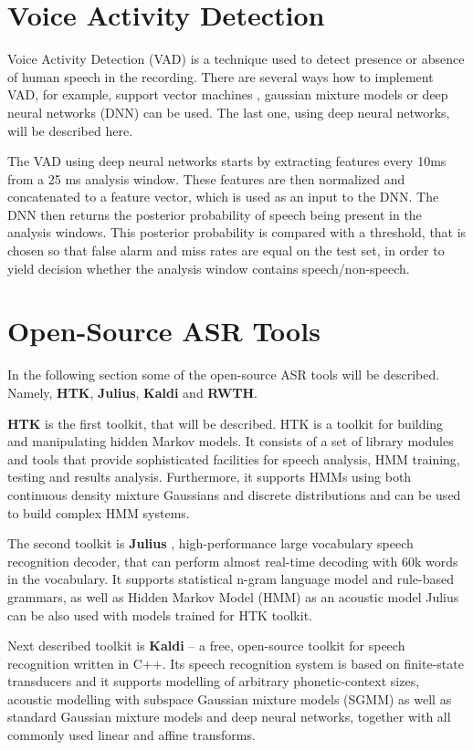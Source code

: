 \section{Voice Activity Detection}
Voice Activity Detection (VAD) is a technique used to detect presence or absence of human speech in the recording.
There are several ways how to implement VAD,
  for example, support vector machines \cite{mesgarani2006discrimination}, gaussian mixture models \cite{ng2012developing} or deep neural networks (DNN) \cite{ryant2013speech} can be used.
The last one, using deep neural networks, will be described here.

The VAD using deep neural networks starts by extracting features every 10ms from a 25 ms analysis window.
These features are then normalized and concatenated to a feature vector,
  which is used as an input to the DNN.
The DNN then returns the posterior probability of speech being present in the analysis windows.
This posterior probability is compared with a threshold,
  that is chosen so that false alarm and miss rates are equal on the test set,
  in order to yield decision whether the analysis window contains speech/non-speech.

\section{Open-Source ASR Tools}
In the following section some of the open-source ASR tools will be described.
Namely, \textbf{HTK}, \textbf{Julius}, \textbf{Kaldi} and \textbf{RWTH}.

\textbf{HTK} \cite{young1997htk} is the first toolkit, that will be described.
HTK is a toolkit for building and manipulating hidden Markov models.
It consists of a set of library modules and tools that provide sophisticated facilities for speech analysis, HMM training, testing and results analysis.
Furthermore, it supports HMMs using both continuous density mixture Gaussians and discrete distributions and can be used to build complex HMM systems.

The second toolkit is \textbf{Julius} \cite{lee2001julius}, high-performance large vocabulary speech recognition decoder,
  that can perform almost real-time decoding with 60k words in the vocabulary.
It supports statistical n-gram language model and rule-based grammars,
  as well as Hidden Markov Model (HMM) as an acoustic model
Julius can be also used with models trained for HTK toolkit.

Next described toolkit is \textbf{Kaldi} \cite{povey2011kaldi} -- a free, open-source toolkit for speech recognition written in C++.
Its speech recognition system is based on finite-state transducers
  and it supports modelling of arbitrary phonetic-context sizes,
  acoustic modelling with subspace Gaussian mixture models (SGMM)
  as well as standard Gaussian mixture models and deep neural networks,
  together with all commonly used linear and affine transforms.

